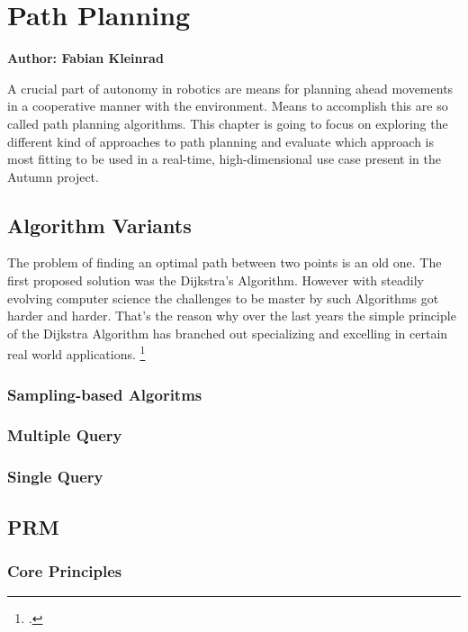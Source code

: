 \chapter{Path Planning}

\textbf{Author: Fabian Kleinrad} 

A crucial part of autonomy in robotics are means for planning ahead movements in a cooperative manner with the environment. Means to accomplish this are so called path planning algorithms. This chapter is going to focus on exploring the different kind of approaches to path planning and evaluate which approach is most fitting to be used in a real-time, high-dimensional use case present in the Autumn project.


\section{Algorithm Variants}

The problem of finding an optimal path between two points is an old one.
The first proposed solution was the Dijkstra's Algorithm. However with steadily evolving computer science the challenges to be master by such Algorithms got harder and harder. That's the reason why over the last years the simple principle of the Dijkstra Algorithm has branched out specializing and excelling in certain real world applications.
\footcite{Pan2020}

\subsection{Sampling-based Algoritms}

\subsection{Multiple Query}

\subsection{Single Query}

\section{PRM}

\subsection{Core Principles}

